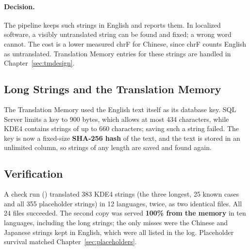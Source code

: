 \paragraph{Decision.} The pipeline keeps such strings in English and reports them. In localized software, a visibly
untranslated string can be found and fixed; a wrong word cannot. The cost is a lower measured chrF for Chinese, since
chrF counts English as untranslated. Translation Memory entries for these strings are handled in
Chapter~\ref{sec:tmdesign}.

\subsection{Long Strings and the Translation Memory}
The Translation Memory used the English text itself as its database key. SQL Server limits a key to 900 bytes, which
allows at most 434 characters, while KDE4 contains strings of up to 660 characters; saving such a string failed. The key
is now a fixed-size \textbf{SHA-256 hash} of the text, and the text is stored in an unlimited column, so strings of any
length are saved and found again.

\subsection{Verification}
A check run () translated 383 KDE4 strings (the three longest, 25 known  cases and
all 355 placeholder strings) in 12 languages, twice, as two identical files. All 24 files succeeded. The second copy was
served \textbf{100\% from the memory} in ten languages, including the long strings; the only misses were the Chinese and
Japanese strings kept in English, which were all listed in the log. Placeholder survival matched Chapter~\ref{sec:placeholders}.

